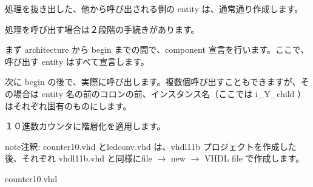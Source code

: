 \documentclass[letterpaper,10pt,dvipdfmx]{sphinxmanual}
\begin{document}
処理を抜き出した、他から呼び出される側の entity は、通常通り作成します。

処理を呼び出す場合は２段階の手続きがあります。

まず architecture から begin までの間で、component 宣言を行います。ここで、呼び出す entity はすべて宣言します。

次に begin の後で、実際に呼び出します。複数個呼び出すこともできますが、その場合は entity 名の前のコロンの前、インスタンス名（ここでは i\_Y\_child ）はそれぞれ固有のものにします。

１０進数カウンタに階層化を適用します。

\begin{notice}{note}{注釈:}
counter10.vhd とledconv.vhd は、vhdl11b プロジェクトを作成した後、それぞれ vhdl11b.vhd と同様にfile \(\rightarrow\) new \(\rightarrow\) VHDL file で作成します。
\end{notice}

counter10.vhd
\end{document}
